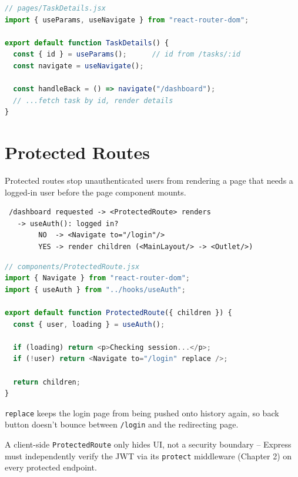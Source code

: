 \begin{lstlisting}[language=JavaScript]
// pages/TaskDetails.jsx
import { useParams, useNavigate } from "react-router-dom";

export default function TaskDetails() {
  const { id } = useParams();      // id from /tasks/:id
  const navigate = useNavigate();

  const handleBack = () => navigate("/dashboard");
  // ...fetch task by id, render details
}
\end{lstlisting}

\section{Protected Routes}

Protected routes stop unauthenticated users from rendering a page that needs
a logged-in user before the page component mounts.

\begin{diagrambox}
\begin{verbatim}
 /dashboard requested -> <ProtectedRoute> renders
   -> useAuth(): logged in?
        NO  -> <Navigate to="/login"/>
        YES -> render children (<MainLayout/> -> <Outlet/>)
\end{verbatim}
\end{diagrambox}

\begin{lstlisting}[language=JavaScript]
// components/ProtectedRoute.jsx
import { Navigate } from "react-router-dom";
import { useAuth } from "../hooks/useAuth";

export default function ProtectedRoute({ children }) {
  const { user, loading } = useAuth();

  if (loading) return <p>Checking session...</p>;
  if (!user) return <Navigate to="/login" replace />;

  return children;
}
\end{lstlisting}

\begin{notebox}[NOTE]
\texttt{replace} keeps the login page from being pushed onto history again,
so back button doesn't bounce between \texttt{/login} and the redirecting page.
\end{notebox}

\begin{warnbox}[WARNING]
A client-side \texttt{ProtectedRoute} only hides UI, not a security boundary --
Express must independently verify the JWT via its \texttt{protect} middleware
(Chapter 2) on every protected endpoint.
\end{warnbox}
